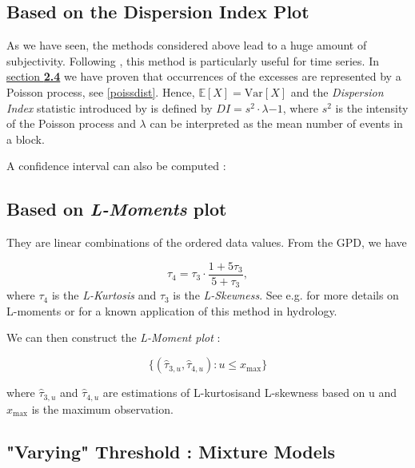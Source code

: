 \documentclass[11pt,a4paper,openany ]{book}
\begin{document}
\subsection*{Based on the Dispersion Index Plot}

As we have seen, the methods considered above lead to a huge amount of subjectivity.
Following \citet{ribatet_users_2006}, this method is particularly useful for time series. In \hyperref[poissonproc]{section \textbf{2.4}} we have proven that occurrences of the excesses are represented by a Poisson process, see \ref{poissdist}. Hence, $\mathbb{E}[X]=\text{Var}[X]$ and the \emph{Dispersion Index} statistic introduced by \cite{cunnane_note_1979} is 
defined by $DI=s^2\cdot\lambda{-1}$, where $s^2$ is the intensity of the Poisson process and $\lambda$ can be interpreted as the mean number of events in a block.

A confidence interval can also be computed :

\subsection*{Based on \emph{L-Moments} plot}

They are linear combinations of the ordered data values. 
From the GPD, we have 

\begin{equation}
\tau_4=\tau_3\cdot \frac{1+5\tau_3}{5+\tau_3},
\end{equation}
where $\tau_4$ is the \emph{L-Kurtosis} and $\tau_3$ is the \emph{L-Skewness}. See e.g. \citet{hosking_regional_1997} for more details on L-moments or \citet{peel_utility_2001} for a known application of this method in hydrology.

We can then construct the \emph{L-Moment plot} :

\begin{equation}
\Big\{(\hat{\tau}_{3,u},\hat{\tau}_{4,u}) : u\leq x_{\text{max}}\Big\}
\end{equation}

where $\hat{\tau}_{3,u}$ and $\hat{\tau}_{4,u}$ are estimations of L-kurtosisand L-skewness based on u and $x_{\text{max}}$ is the maximum observation.






\subsection{"Varying" Threshold : Mixture Models}
\citet{dey_extreme_2016}
\end{document}
